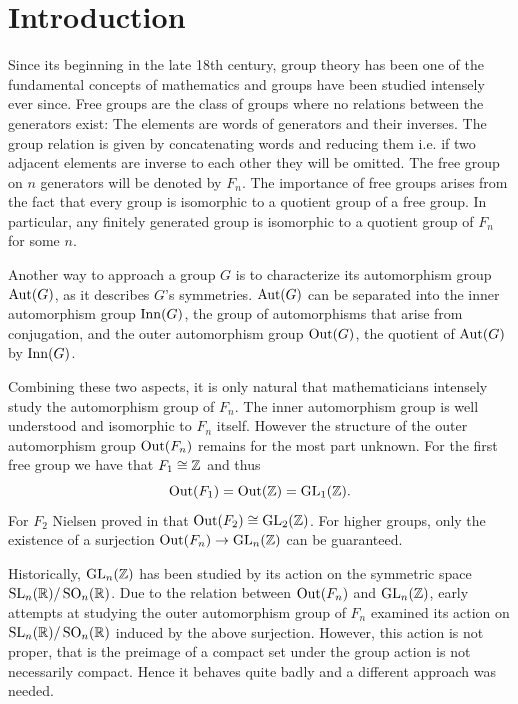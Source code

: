 %

\usepackage{./tikzit/tikzit}
\usepackage[
	sortcites=true,
	maxnames=6,
	minnames=6
]{biblatex}


\usepackage[stable]{footmisc}
\usepackage{caption}
\usepackage{subcaption}
\usepackage{listings}
\usepackage{thmtools,thm-restate}
\lstset{
	breakatwhitespace=True,
	breaklines=True,
	tabsize=2,
	extendedchars=True,
	keepspaces=True
}

	

\newpage
\section{Introduction}
Since its beginning in the late 18th century, group theory has been one of the fundamental concepts of mathematics and groups have been studied intensely ever since.
Free groups are the class of groups where no relations between the generators exist: 
The elements are words of generators and their inverses. The group relation is given by concatenating words
and reducing them i.e. if two adjacent elements are inverse to each other they will be omitted.
The free group on $n$ generators will be denoted by $F_{n}$.
The importance of free groups arises from the fact that every group is isomorphic to a quotient group of a free group.
In particular, any finitely generated group is isomorphic to a quotient group of $F_{n}$ for some $n$.

Another way to approach a group $G$ is to characterize its automorphism group $\operatorname{Aut}(G)$, as it describes $G$'s symmetries.
$\operatorname{Aut}(G)$ can be separated into the inner automorphism group $\operatorname{Inn}(G)$,
the group of automorphisms that arise from conjugation, and the outer automorphism group $\operatorname{Out}(G)$, the quotient of  $\operatorname{Aut}(G)$ by $\operatorname{Inn}(G)$.

Combining these two aspects, it is only natural that mathematicians intensely study the automorphism group of $F_{n}$.
The inner automorphism group is well understood and isomorphic to $F_{n}$ itself.
However the structure of the outer automorphism group $\operatorname{Out}(F_{n})$ remains for the most part unknown.
For the first free group we have that $F_{1} \cong \mathbb{Z}$ and thus
\[
	\operatorname{Out}(F_1) = \operatorname{Out}(\mathbb{Z}) = \operatorname{GL}_{1}(\mathbb{Z})
.\] 
For $F_{2}$ Nielsen proved in \cite{nielsen17} that $\operatorname{Out}(F_2) \cong \operatorname{GL}_{2}(\mathbb{Z})$.
For higher groups, only the existence of a surjection $\operatorname{Out}(F_{n}) \to \operatorname{GL}_{n}(\mathbb{Z})$ can be guaranteed.

Historically, $\operatorname{GL}_{n}(\mathbb{Z})$ has been studied by its action on the symmetric space $\operatorname{SL}_{n}(\mathbb{R}) / \operatorname{SO}_{n}(\mathbb{R})$.
Due to the relation between $\operatorname{Out}(F_{n})$ and $\operatorname{GL}_{n}(\mathbb{Z})$, early attempts at studying the outer automorphism group of $F_{n}$
examined its action on $\operatorname{SL}_{n}(\mathbb{R}) / \operatorname{SO}_{n}(\mathbb{R})$ induced by the above surjection.
However, this action is not proper, that is the preimage of a compact set under the group action is not necessarily compact.
Hence it behaves quite badly and a different approach was needed.

